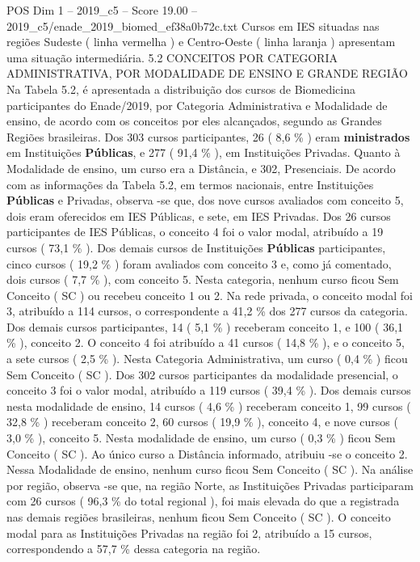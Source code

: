 \begin{textsample}{POS Dim 1 – 2019\_c5 – Score 19.00 – 2019\_c5/enade\_2019\_biomed\_ef38a0b72c.txt}
Cursos em IES situadas nas regiões Sudeste ( linha vermelha ) e Centro-Oeste ( linha laranja ) apresentam uma situação intermediária. 5.2 CONCEITOS POR CATEGORIA ADMINISTRATIVA, POR MODALIDADE DE ENSINO E GRANDE REGIÃO Na Tabela 5.2, é apresentada a distribuição dos cursos de Biomedicina participantes do Enade/2019, por Categoria Administrativa e Modalidade de ensino, de acordo com os conceitos por eles alcançados, segundo as Grandes Regiões brasileiras.
Dos 303 cursos participantes, 26 ( 8,6 \% ) eram \textbf{ministrados} em Instituições \textbf{Públicas}, e 277 ( 91,4 \% ), em Instituições Privadas.
Quanto à Modalidade de ensino, um curso era a Distância, e 302, Presenciais.
De acordo com as informações da Tabela 5.2, em termos nacionais, entre Instituições \textbf{Públicas} e Privadas, observa -se que, dos nove cursos avaliados com conceito 5, dois eram oferecidos em IES Públicas, e sete, em IES Privadas.
Dos 26 cursos participantes de IES Públicas, o conceito 4 foi o valor modal, atribuído a 19 cursos ( 73,1 \% ).
Dos demais cursos de Instituições \textbf{Públicas} participantes, cinco cursos ( 19,2 \% ) foram avaliados com conceito 3 e, como já comentado, dois cursos ( 7,7 \% ), com conceito 5.
Nesta categoria, nenhum curso ficou Sem Conceito ( SC ) ou recebeu conceito 1 ou 2.
Na rede privada, o conceito modal foi 3, atribuído a 114 cursos, o correspondente a 41,2 \% dos 277 cursos da categoria.
Dos demais cursos participantes, 14 ( 5,1 \% ) receberam conceito 1, e 100 ( 36,1 \% ), conceito 2.
O conceito 4 foi atribuído a 41 cursos ( 14,8 \% ), e o conceito 5, a sete cursos ( 2,5 \% ).
Nesta Categoria Administrativa, um curso ( 0,4 \% ) ficou Sem Conceito ( SC ).
Dos 302 cursos participantes da modalidade presencial, o conceito 3 foi o valor modal, atribuído a 119 cursos ( 39,4 \% ).
Dos demais cursos nesta modalidade de ensino, 14 cursos ( 4,6 \% ) receberam conceito 1, 99 cursos ( 32,8 \% ) receberam conceito 2, 60 cursos ( 19,9 \% ), conceito 4, e nove cursos ( 3,0 \% ), conceito 5.
Nesta modalidade de ensino, um curso ( 0,3 \% ) ficou Sem Conceito ( SC ).
Ao único curso a Distância informado, atribuiu -se o conceito 2.
Nessa Modalidade de ensino, nenhum curso ficou Sem Conceito ( SC ).
Na análise por região, observa -se que, na região Norte, as Instituições Privadas participaram com 26 cursos ( 96,3 \% do total regional ), foi mais elevada do que a registrada nas demais regiões brasileiras, nenhum ficou Sem Conceito ( SC ).
O conceito modal para as Instituições Privadas na região foi 2, atribuído a 15 cursos, correspondendo a 57,7 \% dessa categoria na região.

\end{textsample}
